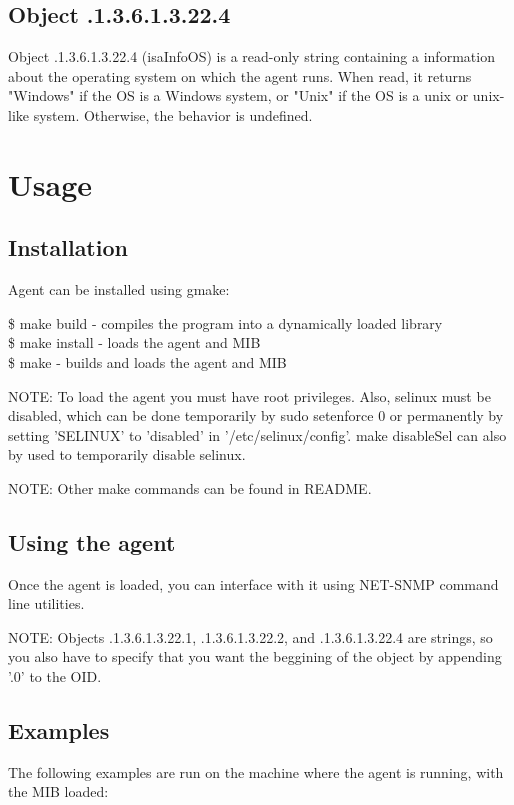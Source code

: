 \documentclass[10pt,a4paper]{article}
\newcommand{\cmdFont}[1]{{\fontfamily{pcr}\selectfont #1}}
\begin{document}
	\subsection{Object .1.3.6.1.3.22.4}
	\label{subsec:variant_object}
	Object .1.3.6.1.3.22.4 (isaInfoOS) is a read-only string containing a information about the operating system on which the agent runs. When read, it returns "Windows" if the OS is a Windows system, or "Unix" if the OS is a unix or unix-like system. Otherwise, the behavior is undefined.
	
	\section{Usage}
	\label{sec:usage}
	
	\subsection{Installation}
	\label{subsec:installation}
	 Agent can be installed using gmake:
	 
	\$ make build - compiles the program into a dynamically loaded library\\
	\$ make install - loads the agent and MIB\\
	\$ make - builds and loads the agent and MIB
	
	NOTE: To load the agent you must have root privileges. Also, selinux must be disabled, which can be done temporarily by \cmdFont{sudo setenforce 0} or permanently by setting 'SELINUX' to 'disabled' in '/etc/selinux/config'. \cmdFont{make disableSel} can also by used to temporarily disable selinux.
	
	NOTE: Other make commands can be found in README.
	
	\subsection{Using the agent}
	\label{subsec:using_agent}
	Once the agent is loaded, you can interface with it using NET-SNMP command line utilities.
	
	NOTE: Objects .1.3.6.1.3.22.1, .1.3.6.1.3.22.2, and .1.3.6.1.3.22.4 are strings, so you also have to specify that you want the beggining of the object by appending '.0' to the OID.
	
	\subsection{Examples}
	\label{subsec:usage_examples}
	The following examples are run on the machine where the agent is running, with the MIB loaded:
	
\end{document}
